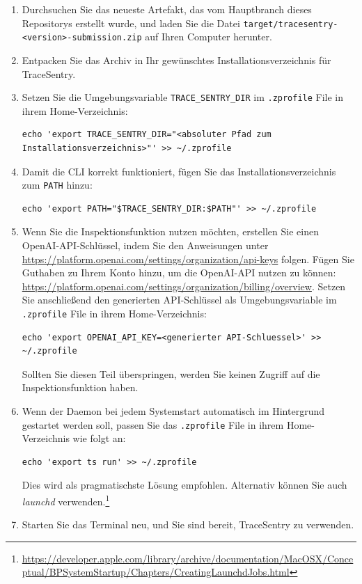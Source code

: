 \documentclass[a4paper,12pt]{report}
\begin{document}
    \begin{enumerate}
        \item Durchsuchen Sie das neueste Artefakt, das vom Hauptbranch dieses Repositorys erstellt wurde, und laden Sie die Datei
        \texttt{target/tracesentry-\textless{}version\textgreater{}-submission.zip} auf Ihren Computer herunter.
        \item Entpacken Sie das Archiv in Ihr gewünschtes Installationsverzeichnis für TraceSentry.
        \item Setzen Sie die Umgebungsvariable \texttt{TRACE\_SENTRY\_DIR} im \texttt{.zprofile} File in ihrem Home-Verzeichnis:
        \begin{lstlisting}[label={lst:lstlisting-mac-1}]
echo 'export TRACE_SENTRY_DIR="<absoluter Pfad zum Installationsverzeichnis>"' >> ~/.zprofile
        \end{lstlisting}
        \item Damit die CLI korrekt funktioniert, fügen Sie das Installationsverzeichnis zum \texttt{PATH} hinzu:
        \begin{lstlisting}[label={lst:lstlisting-mac-2}]
echo 'export PATH="$TRACE_SENTRY_DIR:$PATH"' >> ~/.zprofile
        \end{lstlisting}
        \item Wenn Sie die Inspektionsfunktion nutzen möchten, erstellen Sie einen OpenAI-API-Schlüssel, indem Sie den Anweisungen unter \url{https://platform.openai.com/settings/organization/api-keys} folgen.
        Fügen Sie Guthaben zu Ihrem Konto hinzu, um die OpenAI-API nutzen zu können: \url{https://platform.openai.com/settings/organization/billing/overview}.
        Setzen Sie anschließend den generierten API-Schlüssel als Umgebungsvariable im \texttt{.zprofile} File in ihrem Home-Verzeichnis:
        \begin{lstlisting}[label={lst:lstlisting-mac-3}]
echo 'export OPENAI_API_KEY=<generierter API-Schluessel>' >> ~/.zprofile
        \end{lstlisting}
        Sollten Sie diesen Teil überspringen, werden Sie keinen Zugriff auf die Inspektionsfunktion haben.
        \item Wenn der Daemon bei jedem Systemstart automatisch im Hintergrund gestartet werden soll, passen Sie das \texttt{.zprofile} File in ihrem Home-Verzeichnis wie folgt an:
        \begin{lstlisting}[label={lst:lstlisting-mac-4}]
echo 'export ts run' >> ~/.zprofile
        \end{lstlisting}
        Dies wird als pragmatischste Lösung empfohlen.
        Alternativ können Sie auch \textit{launchd} verwenden.\footnote{\url{https://developer.apple.com/library/archive/documentation/MacOSX/Conceptual/BPSystemStartup/Chapters/CreatingLaunchdJobs.html}}
        \item Starten Sie das Terminal neu, und Sie sind bereit, TraceSentry zu verwenden.
    \end{enumerate}
\end{document}

